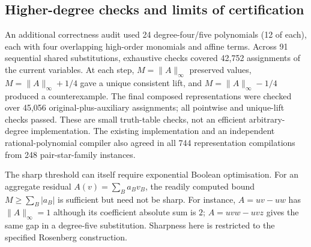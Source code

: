 \documentclass[a4paper,onecolumn,11pt,unpublished]{quantumarticle}
\theoremstyle{remark}
\begin{document}
\subsection{Higher-degree checks and limits of certification}
\label{app:higher-degree-scaling-audit}
An additional correctness audit used 24 degree-four/five polynomials (12 of each),
each with four overlapping high-order monomials and affine terms.
Across 91 sequential shared substitutions, exhaustive checks covered
42,752 assignments of the current variables. At each step,
$M=\|A\|_\infty$ preserved values, $M=\|A\|_\infty+1/4$ gave a unique
consistent lift, and $M=\|A\|_\infty-1/4$ produced a counterexample.
The final composed representations were checked over 45,056
original-plus-auxiliary assignments; all pointwise and unique-lift checks passed.
These are small truth-table checks, not an efficient arbitrary-degree implementation.
The existing implementation and an independent rational-polynomial compiler also
agreed in all 744 representation compilations from 248 pair-star-family instances.

The sharp threshold can itself require exponential Boolean optimisation.
For an aggregate residual $A(v)=\sum_B a_Bv_B$, the readily computed bound
$M\geq\sum_B|a_B|$ is sufficient but need not be sharp. For instance,
$A=u v-u w$ has $\|A\|_\infty=1$ although its coefficient absolute sum is $2$;
$A=u v w-u v z$ gives the same gap in a degree-five substitution.
Sharpness here is restricted to the specified Rosenberg construction.
\end{document}
